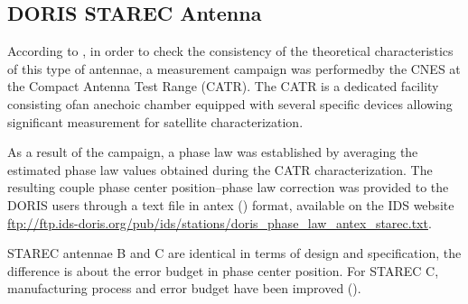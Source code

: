 \subsection{DORIS STAREC Antenna}
According to \cite{TOURAIN2016}, in order to check the consistency of the theoretical 
characteristics of this type of antennae, a measurement campaign was performedby 
the CNES at the Compact Antenna Test Range (CATR). The CATR is a dedicated facility 
consisting ofan anechoic chamber equipped with several specific devices 
allowing significant measurement for satellite characterization.

As a result of the campaign, a phase law was established by averaging the estimated 
phase law values obtained during the CATR characterization. The resulting couple phase 
center position–phase law correction was provided to the  DORIS  users  through  a  
text  file  in  \gls{antex} (\cite{ANTEXv14}) format, available on the IDS website
\url{ftp://ftp.ids-doris.org/pub/ids/stations/doris_phase_law_antex_starec.txt}.

STAREC antennae B and C are identical in terms of design and specification, the
difference is about the error budget in phase center position. For STAREC C,
manufacturing process and error budget have been improved (\cite{DORISGSM}).

